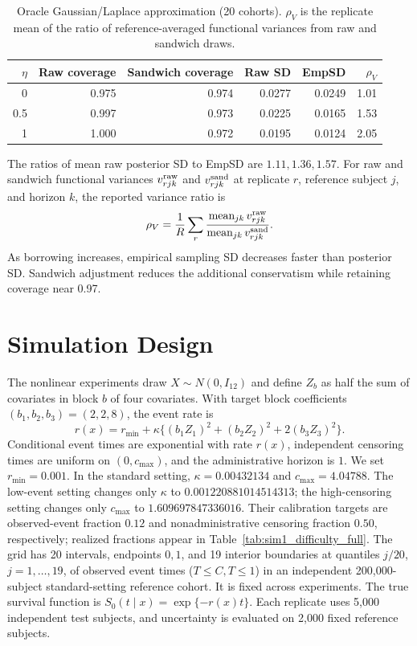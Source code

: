 \documentclass{article} %
\begin{document}
\begin{table}[htbp]
\centering
\caption{Oracle Gaussian/Laplace approximation (20 cohorts). $\rho_V$ is the replicate mean of the ratio of reference-averaged functional variances from raw and sandwich draws.}
\label{tab:e3_global}
\begin{tabular}{@{}rrrrrr@{}}
\toprule
$\eta$ & Raw coverage & Sandwich coverage & Raw SD & EmpSD & $\rho_V$\\
\midrule
0 & 0.975 & 0.974 & 0.0277 & 0.0249 & 1.01\\
0.5 & 0.997 & 0.973 & 0.0225 & 0.0165 & 1.53\\
1 & 1.000 & 0.972 & 0.0195 & 0.0124 & 2.05\\
\bottomrule
\end{tabular}
\end{table}
The ratios of mean raw posterior SD to EmpSD are $1.11,1.36,1.57$. For raw and sandwich functional variances $v^{\rm raw}_{rjk}$ and $v^{\rm sand}_{rjk}$ at replicate $r$, reference subject $j$, and horizon $k$, the reported variance ratio is
\begin{equation}
\rho_V=\frac1R\sum_r\frac{\operatorname{mean}_{jk}v^{\rm raw}_{rjk}}
{\operatorname{mean}_{jk}v^{\rm sand}_{rjk}}.
\label{eq:legacy-functional-ratio}
\end{equation}
As borrowing increases, empirical sampling SD decreases faster than posterior SD. Sandwich adjustment reduces the additional conservatism while retaining coverage near 0.97.

\section{Simulation Design}
\label{sec:mechanism-experiments}
\label{app:sim_design}
The nonlinear experiments draw $X\sim N(0,I_{12})$ and define $Z_b$ as half the sum of covariates in block $b$ of four covariates. With target block coefficients $(b_1,b_2,b_3)=(2,2,8)$, the event rate is
\[
 r(x)=r_{\min}+\kappa\{(b_1Z_1)^2+(b_2Z_2)^2+2(b_3Z_3)^2\}.
\]
Conditional event times are exponential with rate $r(x)$, independent censoring times are uniform on $(0,c_{\max})$, and the administrative horizon is $1$. We set $r_{\min}=0.001$. In the standard setting, $\kappa=0.00432134$ and $c_{\max}=4.04788$. The low-event setting changes only $\kappa$ to $0.001220881014514313$; the high-censoring setting changes only $c_{\max}$ to $1.609697847336016$. Their calibration targets are observed-event fraction $0.12$ and nonadministrative censoring fraction $0.50$, respectively; realized fractions appear in Table~\ref{tab:sim1_difficulty_full}. The grid has 20 intervals, endpoints $0,1$, and 19 interior boundaries at quantiles $j/20$, $j=1,\ldots,19$, of observed event times ($T\le C,T\le1$) in an independent 200,000-subject standard-setting reference cohort. It is fixed across experiments. The true survival function is $S_0(t\mid x)=\exp\{-r(x)t\}$. Each replicate uses 5,000 independent test subjects, and uncertainty is evaluated on 2,000 fixed reference subjects.
\end{document}
